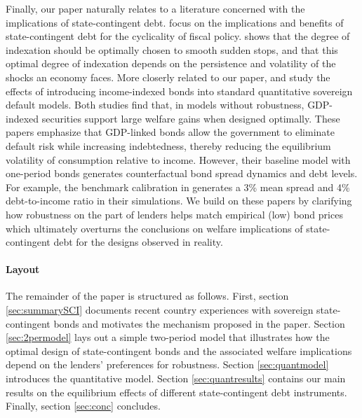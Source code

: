 Finally, our paper naturally relates to a literature concerned with the implications of state-contingent debt. \cite{BorenszteinMauro2004} focus on the implications and benefits of state-contingent debt for the cyclicality of fiscal policy. \cite{Durdu} shows that the degree of indexation should be optimally chosen to smooth sudden stops, and that this optimal degree of indexation depends on the persistence and volatility of the shocks an economy faces. More closerly related to our paper, \cite{HMindexed2012} and \cite{SandlerisSaprizaTaddei2017} study the effects of introducing income-indexed bonds into standard quantitative sovereign default models. Both studies find that, in models without robustness, GDP-indexed securities support large welfare gains when designed optimally. These papers emphasize that GDP-linked bonds allow the government to eliminate default risk while increasing indebtedness, thereby reducing the equilibrium volatility of consumption relative to income. However, their baseline model with one-period bonds generates counterfactual bond spread dynamics and debt levels. For example, the benchmark calibration in \cite{HMindexed2012} generates a 3\% mean spread and 4\% debt-to-income ratio in their simulations. We build on these papers by clarifying how robustness on the part of lenders helps match empirical (low) bond prices which ultimately overturns the conclusions on welfare implications of state-contingent debt for the designs observed in reality.

\paragraph{Layout} The remainder of the paper is structured as follows. First, section \ref{sec:summarySCI} documents recent country experiences with sovereign state-contingent bonds and motivates the mechanism proposed in the paper. Section \ref{sec:2permodel} lays out a simple two-period model that illustrates how the optimal design of state-contingent bonds and the associated welfare implications depend on the lenders' preferences for robustness. Section \ref{sec:quantmodel} introduces the quantitative model. Section \ref{sec:quantresults} contains our main results on the equilibrium effects of different state-contingent debt instruments. Finally, section \ref{sec:conc} concludes.
 
